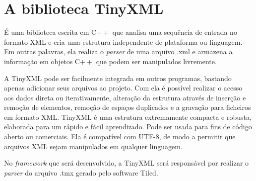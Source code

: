 \section{A biblioteca TinyXML}
\label{tinyXML}
%
É uma biblioteca escrita em C$++$ que analisa uma sequência de entrada no formato XML e cria uma estrutura independente 
de plataforma ou linguagem. Em outras palavras, ela realiza o \textit{parser} de uma arquivo .xml e armazena a informação 
em objetos C$++$ que podem ser manipulados livremente. 
\par 
A TinyXML\cite{TinyXMLTutorial} pode ser facilmente integrada em outros programas, bastando apenas adicionar seus 
arquivos ao projeto. Com ela é possível realizar o acesso aos dados direta ou iterativamente, alteração da estrutura através 
de inserção e remoção de elementos, remoção de espaços duplicados e a gravação para ficheiros em formato XML.
TinyXML é uma estrutura extremamente compacta e robusta, elaborada para um rápido e fácil aprendizado. Pode ser usada para 
fins de código aberto ou comerciais. Ela é compatível com UTF-8, de modo a permitir que arquivos XML sejam manipulados em 
qualquer linguagem.
\par
No \textit{framework} que será desenvolvido, a TinyXML será responsável por realizar o \textit{parser} do arquivo .tmx gerado
pelo software Tiled.
